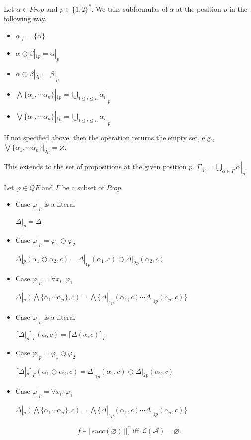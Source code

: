 \begin{definition}
Let \( \alpha \in \mathit{Prop} \) and \( p \in \{1, 2\}^* \). We take subformulas of \( \alpha \) at the position \( p \) in the following way.
\begin{itemize}
\item \( \alpha |_{ \epsilon } = \{ \alpha \}\)
\item \( \alpha \bigcirc \beta |_{ 1p } = \alpha |_{p} \)
\item \( \alpha \bigcirc \beta |_{ 2p } = \beta |_{p} \)
\item \( \bigwedge\{\alpha_1, \cdots \alpha_n \} |_{ 1p } = \bigcup\limits_{1 \leq i \leq n} \alpha_i |_{p} \)
\item \( \bigvee  \{\alpha_1, \cdots \alpha_n \} |_{ 1p } = \bigcup\limits_{1 \leq i \leq n} \alpha_i |_{p} \)
\end{itemize}
If not specified above, then the operation returns the empty set, e.g., \(
\bigvee \{\alpha_1, \cdots \alpha_n \} |_{ 2p } = \varnothing \).
\end{definition}
This extends to the set of propositions at the given position \( p \). \(\Gamma|_{p} = \bigcup\limits_{\alpha \in \Gamma}\alpha|_p \).

\begin{definition}
Let \( \varphi \in \mathit{QF} \) and \( \Gamma \) be a subset of \( \mathit{Prop} \).
\begin{itemize}
\item Case \( \varphi |_p \) is a literal

\( \Delta|_p = \Delta \)
\item Case \( \varphi |_p = \varphi_1 \bigcirc \varphi_2 \) 

\( \Delta|_p(\alpha_1 \bigcirc \alpha_2, c) = \Delta|_{1p}(\alpha_1, c) \bigcirc \Delta|_{2p}(\alpha_2, c) \)
\item Case \( \varphi |_p = \forall x_i .\ \varphi_1 \) 

\( \Delta|_p(\bigwedge\{\alpha_1 \cdots \alpha_n\}, c) = \bigwedge\{ \Delta|_{1p}(\alpha_1, c) \cdots \Delta|_{1p}(\alpha_n, c)\} \)
\end{itemize}
\end{definition}

\begin{definition}
\begin{itemize}
\item Case \( \varphi |_p \) is a literal

\( \lceil\Delta|_p\rceil_\Gamma(\alpha, c) = \lceil\Delta(\alpha, c)\rceil_\Gamma \)
\item Case \( \varphi |_p = \varphi_1 \bigcirc \varphi_2 \) 

\( \lceil\Delta|_p\rceil_\Gamma(\alpha_1 \bigcirc \alpha_2, c) = \Delta|_{1p}(\alpha_1, c) \bigcirc \Delta|_{2p}(\alpha_2, c) \)
\item Case \( \varphi |_p = \forall x_i .\ \varphi_1 \) 

\( \Delta|_p(\bigwedge\{\alpha_1 \cdots \alpha_n\}, c) = \bigwedge\{ \Delta|_{1p}(\alpha_1, c) \cdots \Delta|_{1p}(\alpha_n, c)\} \)
\end{itemize}
\end{definition}

\begin{theorem}
 \[ f \models \lceil \mathit{succ}(\varnothing) \rceil|_{\epsilon}^* \text{ iff }
\mathcal{L}(\mathcal{A}) = \varnothing. \]
\end{theorem}
